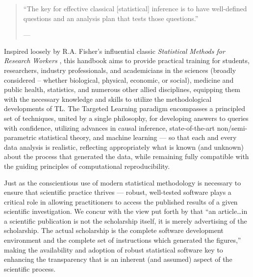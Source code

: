 \documentclass[
  12pt, krantz2,
]{krantz}
\newcommand{\1}{\mathbbm{1}}
\theoremstyle{definition}
\theoremstyle{definition}
\theoremstyle{definition}
\theoremstyle{definition}
\theoremstyle{remark}
\begin{document}
\begin{quote}
``The key for effective classical {[}statistical{]} inference is to have
well-defined questions and an analysis plan that tests those questions.''

--- \citet{nosek2018preregistration}
\end{quote}

Inspired loosely by R.A. Fisher's influential classic \emph{Statistical Methods for
Research Workers} \citep{fisher1946statistical}, this handbook aims to provide
practical training for students, researchers, industry professionals, and
academicians in the sciences (broadly considered -- whether biological,
physical, economic, or social), medicine and public health, statistics, and
numerous other allied disciplines, equipping them with the necessary knowledge
and skills to utilize the methodological developments of TL. The Targeted
Learning paradigm encompasses a principled set of techniques, united by a single
philosophy, for developing answers to queries with confidence, utilizing
advances in causal inference, state-of-the-art non/semi-parametric statistical
theory, and machine learning --- so that each and every data analysis is
realistic, reflecting appropriately what is known (and unknown) about the
process that generated the data,
while remaining fully compatible with the guiding principles of computational
reproducibility.

Just as the conscientious use of modern statistical methodology is necessary to
ensure that scientific practice thrives --- robust, well-tested software plays a
critical role in allowing practitioners to access the published results of a
given scientific investigation. We concur with the view put forth by
\citet{buckheit1995wavelab} that ``an article\ldots in a scientific publication is not the
scholarship itself, it is merely advertising of the scholarship. The actual
scholarship is the complete software development environment and the complete
set of instructions which generated the figures,'' making the availability and
adoption of robust statistical software key to enhancing the transparency that
is an inherent (and assumed) aspect of the scientific process.
\end{document}
